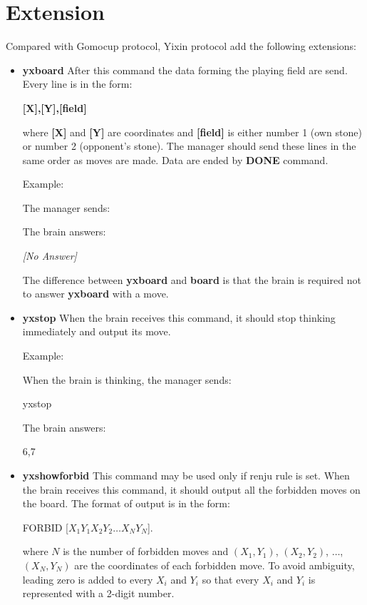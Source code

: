\documentclass[a4paper,12pt]{article}
\begin{document}
\section{Extension}
Compared with Gomocup protocol, Yixin protocol add the following extensions:
\begin{itemize}
\item \textbf{yxboard}
After this command the data forming the playing field are send. Every line is in the form:

\fbox
{
\textbf{[X],[Y],[field]}
}

where \textbf{[X]} and \textbf{[Y]} are coordinates and \textbf{[field]} is either number 1 (own stone) or number 2 (opponent's stone). The manager should send these lines in the same order as moves are made. Data are ended by \textbf{DONE} command. 

Example: 

The manager sends:

\fbox
{
}

The brain answers:

\fbox
{
\textit{[No Answer]}
}

The difference between \textbf{yxboard} and \textbf{board} is that the brain is required not to answer \textbf{yxboard} with a move.

\item \textbf{yxstop}
When the brain receives this command, it should stop thinking immediately and output its move.

Example:

When the brain is thinking, the manager sends:

\fbox
{
yxstop
}

The brain answers:

\fbox
{
6,7
}

\item \textbf{yxshowforbid}
This command may be used only if renju rule is set. When the brain receives this command, it should output all the forbidden moves on the board. The format of output is in the form:

\fbox
{
FORBID [$X_1Y_1X_2Y_2\ldots X_NY_N$].
}

where $N$ is the number of forbidden moves and $(X_1,Y_1)$, $(X_2,Y_2)$, $\ldots$, $(X_N,Y_N)$ are the coordinates of each forbidden move. To avoid ambiguity, leading zero is added to every $X_i$ and $Y_i$ so that every $X_i$ and $Y_i$ is represented with a 2-digit number.


\end{itemize}
\end{document}
